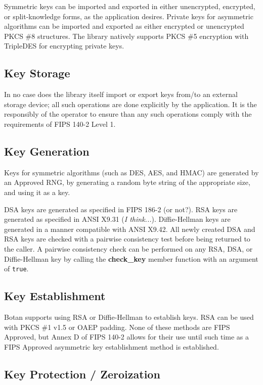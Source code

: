 \documentclass{article}
\newcommand{\type}[1]{\texttt{#1}}
\newcommand{\function}[1]{\textbf{#1}}
\begin{document}
Symmetric keys can be imported and exported in either unencrypted, encrypted,
or split-knowledge forms, as the application desires. Private keys for
asymmetric algorithms can be imported and exported as either encrypted or
unencrypted PKCS \#8 structures. The library natively supports PKCS \#5
encryption with TripleDES for encrypting private keys.

\subsection{Key Storage}

In no case does the library itself import or export keys from/to an external
storage device; all such operations are done explicitly by the application. It
is the responsibly of the operator to ensure than any such operations comply
with the requirements of FIPS 140-2 Level 1.

\subsection{Key Generation}

Keys for symmetric algorithms (such as DES, AES, and HMAC) are generated by an
Approved RNG, by generating a random byte string of the appropriate size, and
using it as a key.

DSA keys are generated as specified in FIPS 186-2 (or not?). RSA keys are
generated as specified in ANSI X9.31 (\emph{I think...}). Diffie-Hellman keys
are generated in a manner compatible with ANSI X9.42. All newly created DSA and
RSA keys are checked with a pairwise consistency test before being returned to
the caller. A pairwise consistency check can be performed on any RSA, DSA, or
Diffie-Hellman key by calling the \function{check\_key} member function with
an argument of \type{true}.

\subsection{Key Establishment}

Botan supports using RSA or Diffie-Hellman to establish keys. RSA can be used
with PKCS \#1 v1.5 or OAEP padding. None of these methods are FIPS Approved,
but Annex D of FIPS 140-2 allows for their use until such time as a FIPS
Approved asymmetric key establishment method is established.

\subsection{Key Protection / Zeroization}
\end{document}
